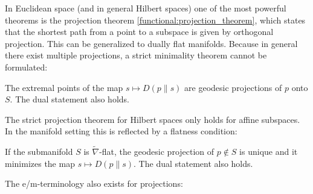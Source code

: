     In Euclidean space (and in general Hilbert spaces) one of the most powerful theorems is the projection theorem \ref{functional:projection_theorem}, which states that the shortest path from a point to a subspace is given by orthogonal projection. This can be generalized to dually flat manifolds.
    Because in general there exist multiple projections, a strict minimality theorem cannot be formulated:
    \begin{theorem}
        The extremal points of the map $s\mapsto D(p\|s)$ are geodesic projections of $p$ onto $S$. The dual statement also holds.
    \end{theorem}
    The strict projection theorem for Hilbert spaces only holds for affine subspaces. In the manifold setting this is reflected by a flatness condition:
    \begin{property}
        If the submanifold $S$ is $\widetilde{\nabla}$-flat, the geodesic projection of $p\not\in S$ is unique and it minimizes the map $s\mapsto D(p\|s)$. The dual statement also holds.
    \end{property}

    The e/m-terminology also exists for projections:

